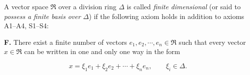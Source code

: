 A vector space $\mathfrak{R}$ over a division ring $\Delta$ is called \emph{finite dimensional} (or said to \emph{possess a finite basis over $\Delta$}) if the following axiom holds in addition to axioms A1--A4, S1--S4:

\textbf{F.} There exist a finite number of vectors $e_1, e_2, \cdots, e_n \in \mathfrak{R}$ such that every vector $x \in \mathfrak{R}$ can be written in one and only one way in the form

$$x = \xi_1 e_1 + \xi_2 e_2 + \cdots + \xi_n e_n, \qquad \xi_i \in \Delta.$$
